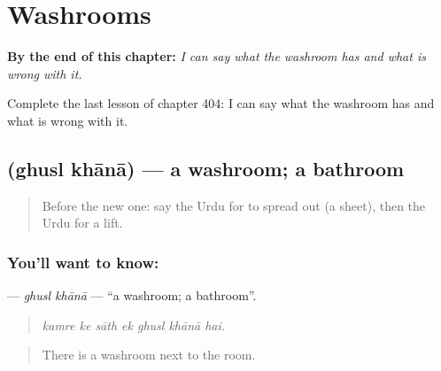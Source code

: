 
\chapter{Washrooms}
\label{ch:ur-washrooms}

\begin{chapteropening}
\textbf{By the end of this chapter:} \emph{I can say what the washroom has and what is wrong with it.}

Complete the last lesson of chapter 404: I can say what the washroom has and what is wrong with it.
\end{chapteropening}

\section[\texorpdfstring{\ur{غسل} \ur{خانہ} (ghusl khānā)}{غسل خانہ (ghusl khānā)}]{  (ghusl khānā) — a washroom; a bathroom}

\label{lesson:UR-C404-ghusl-khana}



\begin{quote}
Before the new one: say the Urdu for to spread out (a sheet), then the Urdu for a lift.
\end{quote}

\subsection*{You'll want to know:  }
\textbf{ } — \emph{ghusl khānā} — \textquotedblleft{}a washroom; a bathroom\textquotedblright{}.

\begin{quote}
      
\end{quote}

\begin{quote}
\emph{kamre ke sāth ek ghusl khānā hai.}
\end{quote}

\begin{quote}
There is a washroom next to the room.
\end{quote}

